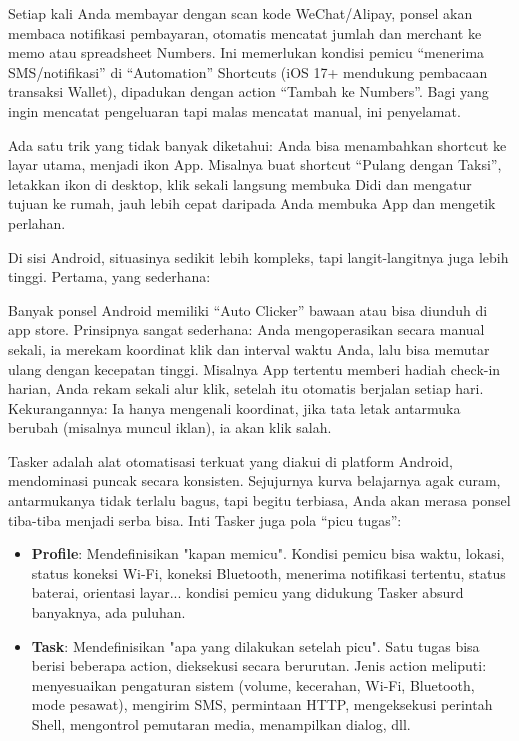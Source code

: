 Setiap kali Anda membayar dengan scan kode WeChat/Alipay, ponsel akan membaca notifikasi pembayaran, otomatis mencatat jumlah dan merchant ke memo atau spreadsheet Numbers. Ini memerlukan kondisi pemicu “menerima SMS/notifikasi” di “Automation” Shortcuts (iOS 17+ mendukung pembacaan transaksi Wallet), dipadukan dengan action “Tambah ke Numbers”. Bagi yang ingin mencatat pengeluaran tapi malas mencatat manual, ini penyelamat.

Ada satu trik yang tidak banyak diketahui: Anda bisa menambahkan shortcut ke layar utama, menjadi ikon App. Misalnya buat shortcut “Pulang dengan Taksi”, letakkan ikon di desktop, klik sekali langsung membuka Didi dan mengatur tujuan ke rumah, jauh lebih cepat daripada Anda membuka App dan mengetik perlahan.


Di sisi Android, situasinya sedikit lebih kompleks, tapi langit-langitnya juga lebih tinggi. Pertama, yang sederhana:


Banyak ponsel Android memiliki “Auto Clicker” bawaan atau bisa diunduh di app store. Prinsipnya sangat sederhana: Anda mengoperasikan secara manual sekali, ia merekam koordinat klik dan interval waktu Anda, lalu bisa memutar ulang dengan kecepatan tinggi. Misalnya App tertentu memberi hadiah check-in harian, Anda rekam sekali alur klik, setelah itu otomatis berjalan setiap hari. Kekurangannya: Ia hanya mengenali koordinat, jika tata letak antarmuka berubah (misalnya muncul iklan), ia akan klik salah.


Tasker adalah alat otomatisasi terkuat yang diakui di platform Android, mendominasi puncak secara konsisten. Sejujurnya kurva belajarnya agak curam, antarmukanya tidak terlalu bagus, tapi begitu terbiasa, Anda akan merasa ponsel tiba-tiba menjadi serba bisa. Inti Tasker juga pola “picu tugas”:

\begin{itemize}
  \item \textbf{Profile}: Mendefinisikan "kapan memicu". Kondisi pemicu bisa waktu, lokasi, status koneksi Wi-Fi, koneksi Bluetooth, menerima notifikasi tertentu, status baterai, orientasi layar... kondisi pemicu yang didukung Tasker absurd banyaknya, ada puluhan.
  \item \textbf{Task}: Mendefinisikan "apa yang dilakukan setelah picu". Satu tugas bisa berisi beberapa action, dieksekusi secara berurutan. Jenis action meliputi: menyesuaikan pengaturan sistem (volume, kecerahan, Wi-Fi, Bluetooth, mode pesawat), mengirim SMS, permintaan HTTP, mengeksekusi perintah Shell, mengontrol pemutaran media, menampilkan dialog, dll.
\end{itemize}

